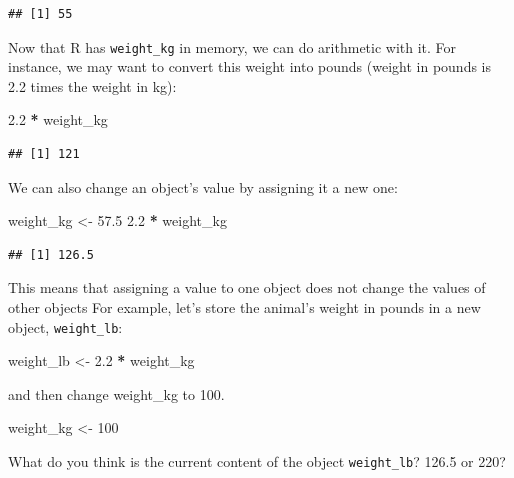 \documentclass[
]{book}
\newenvironment{Shaded}{\begin{snugshade}}{\end{snugshade}}
\newcommand{\DecValTok}[1]{\textcolor[rgb]{0.00,0.00,0.81}{#1}}
\newcommand{\FloatTok}[1]{\textcolor[rgb]{0.00,0.00,0.81}{#1}}
\newcommand{\NormalTok}[1]{#1}
\newcommand{\OtherTok}[1]{\textcolor[rgb]{0.56,0.35,0.01}{#1}}
\newcommand{\SpecialCharTok}[1]{\textcolor[rgb]{0.81,0.36,0.00}{\textbf{#1}}}
\begin{document}
\begin{verbatim}
## [1] 55
\end{verbatim}

Now that R has \texttt{weight\_kg} in memory, we can do arithmetic with it. For instance, we may want to convert this weight into pounds (weight in pounds is 2.2 times the weight in kg):

\begin{Shaded}
\begin{Highlighting}[]
\FloatTok{2.2} \SpecialCharTok{*}\NormalTok{ weight\_kg}
\end{Highlighting}
\end{Shaded}

\begin{verbatim}
## [1] 121
\end{verbatim}

We can also change an object's value by assigning it a new one:

\begin{Shaded}
\begin{Highlighting}[]
\NormalTok{weight\_kg }\OtherTok{\textless{}{-}} \FloatTok{57.5}
\FloatTok{2.2} \SpecialCharTok{*}\NormalTok{ weight\_kg}
\end{Highlighting}
\end{Shaded}

\begin{verbatim}
## [1] 126.5
\end{verbatim}

This means that assigning a value to one object does not change the values of other objects For example, let's store the animal's weight in pounds in a new object, \texttt{weight\_lb}:

\begin{Shaded}
\begin{Highlighting}[]
\NormalTok{weight\_lb }\OtherTok{\textless{}{-}} \FloatTok{2.2} \SpecialCharTok{*}\NormalTok{ weight\_kg}
\end{Highlighting}
\end{Shaded}

and then change weight\_kg to 100.

\begin{Shaded}
\begin{Highlighting}[]
\NormalTok{weight\_kg }\OtherTok{\textless{}{-}} \DecValTok{100}
\end{Highlighting}
\end{Shaded}

What do you think is the current content of the object \texttt{weight\_lb}? 126.5 or 220?
\end{document}
